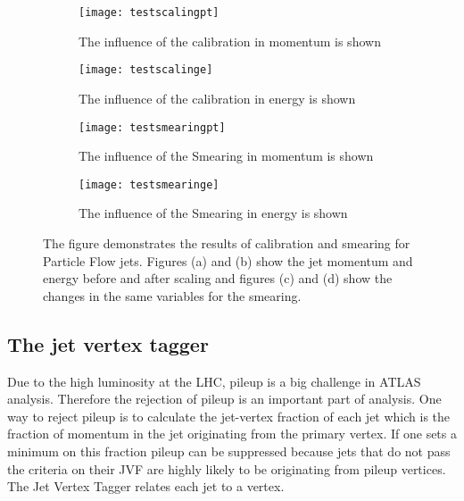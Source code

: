 \begin{figure}
\centering
\begin{subfigure}[b]{0.5\figwidth}
\texttt{[image: testscalingpt]}
\caption[Influence of the JES on the transversal momentum]{The influence of the calibration in momentum is shown}
\label{fig:testscalingpt}
\end{subfigure}
\quad
\begin{subfigure}[b]{0.5\figwidth}
\texttt{[image: testscalinge]}
\caption[Influence of the JES on the energy]{The influence of the calibration in energy is shown}
\label{fig:testscalinge}
\end{subfigure}


\begin{subfigure}[b]{0.5\figwidth}
\texttt{[image: testsmearingpt]}
\caption[Influence of the Smearing on the transversal momentum]{The influence of the Smearing in momentum is shown}
\label{fig:testsmearingpt}
\end{subfigure}
\quad
\begin{subfigure}[b]{0.5\figwidth}
\texttt{[image: testsmearinge]}
\caption[Influence of the Smearing on the energy]{The influence of the Smearing in energy is shown}
\label{fig:testsmearinge}
\end{subfigure}
\caption[Jet Calibration and Smearing]{The figure demonstrates the results of calibration and smearing for Particle Flow jets. Figures (a) and (b) show the jet momentum and energy before and after scaling and figures (c) and (d) show the changes in the same variables for the smearing.}
\label{jetsmearingandcalibration}
\end{figure}


\subsection{The jet vertex tagger}

Due to the high luminosity at the LHC, pileup is a big challenge in ATLAS analysis. Therefore the rejection of pileup is an important part of analysis. One way to reject pileup is to calculate the jet-vertex fraction of each jet which is the fraction of momentum in the jet originating from the primary vertex. If one sets a minimum on this fraction pileup can be suppressed because jets that do not pass the criteria on their JVF are highly likely to be originating from pileup vertices. The Jet Vertex Tagger relates each jet to a vertex.


